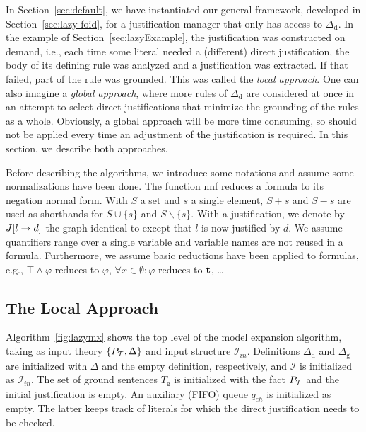 \documentclass[11pt]{article}
\newcommand{\m}[1]{\ensuremath{#1}\xspace}
\newcommand{\trval}[1]{\m{{\bf #1}}}
\newcommand{\ltrue}{\trval{t}}
\newcommand{\true}{\m{\top}}
\newcommand{\I}{\m{\mathcal{I}}}
\newcommand{\Iin}{\m{\I_{in}}}
\newcommand{\theory}{\m{\mathcal{T}}}
\newcommand{\D}{\m{\Delta}}
\newcommand{\f}{\m{\varphi}}
\newcommand{\elim}{\m{\backslash}}
\newcommand{\typed}[2]{\m{#1\in #2:}}
\theoremstyle{plain}
\theoremstyle{definition}
\theoremstyle{example_basic}
\theoremstyle{example_contd}
\theoremstyle{plain}
\newcommand{\Dg}{\ensuremath{\D_\text{g}}\xspace}
\newcommand{\Dd}{\ensuremath{\D_\text{d}}\xspace}
\newcommand{\Sg}{\ensuremath{T_\text{g}}\xspace}
\newcommand{\pt}{\ensuremath{P_\text{\theory}}\xspace}
\newcommand{\change}[1]{#1}
\begin{document}
\newcommand{\algfalse}{\ensuremath{\mathit{false}}\xspace}
\newcommand{\algundef}{\ensuremath{\mathit{undef}}\xspace}
\newcommand{\algtrue}{\ensuremath{\mathit{true}}\xspace}

In Section~\ref{sec:default}, we have instantiated our general framework, developed in Section~\ref{sec:lazy-foid}, for a justification manager that only has access to \Dd. In the example of Section~\ref{sec:lazyExample}, the justification was constructed on demand, i.e., each time some literal needed a (different) direct justification, the body of its defining rule was analyzed and a justification was extracted. If that failed, part of the rule was grounded. This was called the \emph{local approach}. One can also imagine a \emph{global approach}, where more rules of \Dd are considered at once in an attempt to select direct justifications that minimize the grounding of the rules as a whole. Obviously, a global approach will be more time consuming, so should not be applied every time an adjustment of the justification is required. In this section, we describe both approaches.

Before describing the algorithms, we introduce some notations and assume some normalizations have been done. The function \textsf{nnf} reduces a formula to its negation normal form. With $S$ a set and $s$ a single element, $S+s$ and $S-s$ are used as shorthands for $S\cup \{s\}$ and $S \elim \{s\}$. \change{With \jgraph a justification, we denote by $J[l\rightarrow d]$ the graph identical to \jgraph except that $l$ is now justified by $d$.} We assume quantifiers range over a single variable and variable names are not reused in a formula. Furthermore, we assume basic reductions have been applied to formulas, e.g., $\true \land \f$ reduces to \f, $\forall \typed{x}{\emptyset} \f$ reduces to \ltrue, \ldots


\subsection{The Local Approach}\label{sec:local}
\newcommand{\changes}{\ensuremath{q_{ch}}\xspace}

Algorithm~\ref{fig:lazymx} shows the top level of the \lazymx model expansion algorithm, taking as input theory $\{\pt, \D\}$ and input structure \Iin. Definitions \Dd and \Dg are initialized with \D and the empty definition, respectively, and \I is initialized as \Iin. The set of ground sentences \Sg is initialized with the fact \pt and the initial justification \jgraph is empty. An auxiliary (FIFO) queue \changes is initialized as empty. The latter keeps track of literals for which the direct justification needs to be checked. 
\end{document}
